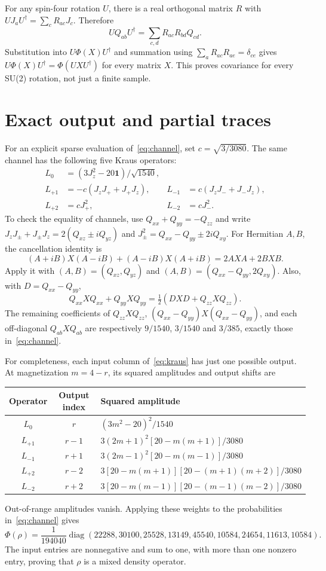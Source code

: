 \documentclass[11pt]{article}
\newcommand{\id}{\mathbf{1}}
\begin{document}
For any spin-four rotation $U$, there is a real orthogonal matrix $R$ with
$UJ_aU^\dagger=\sum_cR_{ac}J_c$. Therefore
\[
 UQ_{ab}U^\dagger=\sum_{c,d}R_{ac}R_{bd}Q_{cd}.
\]
Substitution into $U\Phi(X)U^\dagger$ and summation using
$\sum_aR_{ac}R_{ae}=\delta_{ce}$ gives
$U\Phi(X)U^\dagger=\Phi(UXU^\dagger)$ for every matrix $X$.
This proves covariance for every SU(2) rotation, not just a finite sample.

\section{Exact output and partial traces}
For an explicit sparse evaluation of~\eqref{eq:channel}, set $c=\sqrt{3/3080}$.
The same channel has the following five Kraus operators:
\begin{align}\label{eq:kraus}
 L_0&=(3J_z^2-20\id)/\sqrt{1540},\nonumber\\
 L_{+1}&=-c(J_zJ_++J_+J_z),&L_{-1}&=c(J_zJ_-+J_-J_z),\nonumber\\
 L_{+2}&=cJ_+^2,&L_{-2}&=cJ_-^2.
\end{align}
To check the equality of channels, use
$Q_{xx}+Q_{yy}=-Q_{zz}$ and write
$J_zJ_\pm+J_\pm J_z=2(Q_{xz}\pm iQ_{yz})$ and
$J_\pm^2=Q_{xx}-Q_{yy}\pm2iQ_{xy}$.
For Hermitian $A,B$, the cancellation identity is
\[
 (A+iB)X(A-iB)+(A-iB)X(A+iB)=2AXA+2BXB.
\]
Apply it with $(A,B)=(Q_{xz},Q_{yz})$ and
$(A,B)=(Q_{xx}-Q_{yy},2Q_{xy})$. Also, with $D=Q_{xx}-Q_{yy}$,
\[
 Q_{xx}XQ_{xx}+Q_{yy}XQ_{yy}
 =\tfrac12(DXD+Q_{zz}XQ_{zz}).
\]
The remaining
coefficients of $Q_{zz}XQ_{zz}$, $(Q_{xx}-Q_{yy})X(Q_{xx}-Q_{yy})$,
and each off-diagonal $Q_{ab}XQ_{ab}$ are respectively
$9/1540$, $3/1540$ and $3/385$, exactly those in~\eqref{eq:channel}.

For completeness, each input column of~\eqref{eq:kraus} has just one possible
output. At magnetization $m=4-r$, its squared amplitudes and output shifts are
\begin{center}\small
\begin{tabular}{ccl}
\toprule
Operator & Output index & Squared amplitude\\
\midrule
$L_0$ & $r$ & $(3m^2-20)^2/1540$\\
$L_{+1}$ & $r-1$ & $3(2m+1)^2[20-m(m+1)]/3080$\\
$L_{-1}$ & $r+1$ & $3(2m-1)^2[20-m(m-1)]/3080$\\
$L_{+2}$ & $r-2$ & $3[20-m(m+1)][20-(m+1)(m+2)]/3080$\\
$L_{-2}$ & $r+2$ & $3[20-m(m-1)][20-(m-1)(m-2)]/3080$\\
\bottomrule
\end{tabular}
\end{center}
Out-of-range amplitudes vanish. Applying these weights to the probabilities
in~\eqref{eq:channel} gives
\begin{equation}\label{eq:output}
 \Phi(\rho)=\frac1{194040}\operatorname{diag}
 (22288,30100,25528,13149,45540,10584,24654,11613,10584).
\end{equation}
The input entries are nonnegative and sum to one, with more than one nonzero
entry, proving that $\rho$ is a mixed density operator.
\end{document}
